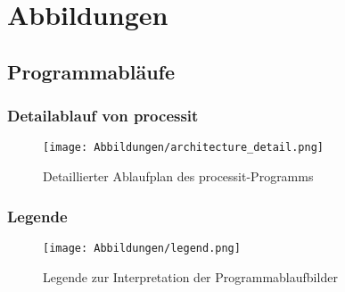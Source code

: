 \chapter{Abbildungen}
\section{Programmabläufe}

\subsection{Detailablauf von processit} \label{a:processit_detailablauf}

\begin{figure}[h!]
	\texttt{[image: Abbildungen/architecture\_detail.png]}
	\centering
	\caption{Detaillierter Ablaufplan des processit-Programms}
\end{figure}
\subsection{Legende} \label{a:legende}

\begin{figure}[h!]
	\texttt{[image: Abbildungen/legend.png]}
	\centering
	\caption{Legende zur Interpretation der Programmablaufbilder}
\end{figure}
